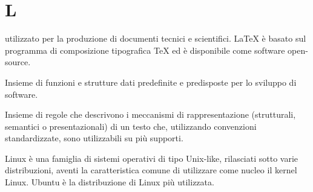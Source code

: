 \section{L}

 utilizzato per la produzione di documenti tecnici e scientifici.
\LaTeX{} è basato sul programma di composizione tipografica \TeX{} ed è disponibile come software open-source.

Insieme di funzioni e strutture dati predefinite e predisposte per lo sviluppo di software.

Insieme di regole che descrivono i meccanismi di rappresentazione (strutturali, semantici o presentazionali) di un testo che, utilizzando convenzioni standardizzate, sono utilizzabili su più supporti.

Linux è una famiglia di sistemi operativi di tipo Unix-like, rilasciati sotto varie distribuzioni, aventi la caratteristica comune di utilizzare come nucleo il kernel Linux. Ubuntu è la distribuzione di Linux più utilizzata.

